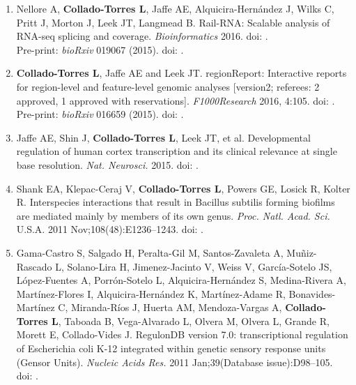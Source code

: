 \begin{enumerate}
        \item Nellore A, \textbf{Collado-Torres L}, Jaffe AE, Alquicira-Hernández J, Wilks C, Pritt J, Morton J, Leek JT, Langmead B. Rail-RNA: Scalable analysis of RNA-seq splicing and coverage. \emph{Bioinformatics} 2016. doi: .
        \\ Pre-print: \emph{bioRxiv} 019067 (2015). doi: .
        
        \item \textbf{Collado-Torres L}, Jaffe AE and Leek JT. regionReport: Interactive reports for region-level and feature-level genomic analyses [version2; referees: 2 approved, 1 approved with reservations]. \emph{F1000Research} 2016, 4:105. doi: .
        \\ Pre-print: \emph{bioRxiv} 016659 (2015). doi: .
        
        \item Jaffe AE, Shin J, \textbf{Collado-Torres L}, Leek JT, et al. Developmental regulation of human cortex transcription and its clinical relevance at single base resolution. \emph{Nat. Neurosci.} 2015. doi: .
        
        \item Shank EA, Klepac-Ceraj V, \textbf{Collado-Torres L}, Powers GE, Losick R, Kolter R. Interspecies interactions that result in Bacillus subtilis forming biofilms are mediated mainly by members of its own genus. \emph{Proc. Natl. Acad. Sci.} U.S.A. 2011 Nov;108(48):E1236–1243. doi: .
        
        \item Gama-Castro S, Salgado H, Peralta-Gil M, Santos-Zavaleta A, Muñiz-Rascado L, Solano-Lira H, Jimenez-Jacinto V, Weiss V, Garc\'ia-Sotelo JS, L\'opez-Fuentes A, Porr\'on-Sotelo L, Alquicira-Hern\'andez S, Medina-Rivera A, Mart\'inez-Flores I, Alquicira-Hern\'andez K, Mart\'inez-Adame R, Bonavides-Mart\'inez C, Miranda-R\'ios J, Huerta AM, Mendoza-Vargas A, \textbf{Collado-Torres L}, Taboada B, Vega-Alvarado L, Olvera M, Olvera L, Grande R, Morett E, Collado-Vides J. RegulonDB version 7.0: transcriptional regulation of Escherichia coli K-12 integrated within genetic sensory response units (Gensor Units). \emph{Nucleic Acids Res.} 2011 Jan;39(Database issue):D98–105. doi: .
    \end{enumerate}
